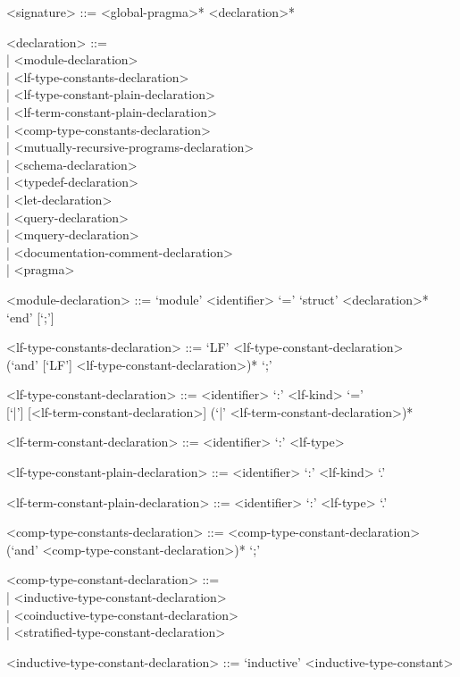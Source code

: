 \documentclass[11pt]{article}
\begin{document}
\begin{grammar}
<signature> ::= <global-pragma>* <declaration>*

<declaration> ::= \hfill\\
| <module-declaration>\\
| <lf-type-constants-declaration>\\
| <lf-type-constant-plain-declaration>\\
| <lf-term-constant-plain-declaration>\\
| <comp-type-constants-declaration>\\
| <mutually-recursive-programs-declaration>\\
| <schema-declaration>\\
| <typedef-declaration>\\
| <let-declaration>\\
| <query-declaration>\\
| <mquery-declaration>\\
| <documentation-comment-declaration>\\
| <pragma>

<module-declaration> ::= `module' <identifier> `=' `struct' <declaration>* `end' [`;']

<lf-type-constants-declaration> ::= `LF' <lf-type-constant-declaration>\\
(`and' [`LF'] <lf-type-constant-declaration>)* `;'

<lf-type-constant-declaration> ::= <identifier> `:' <lf-kind> `='\\{}
[`|'] [<lf-term-constant-declaration>] (`|' <lf-term-constant-declaration>)*

<lf-term-constant-declaration> ::= <identifier> `:' <lf-type>

<lf-type-constant-plain-declaration> ::= <identifier> `:' <lf-kind> `.'

<lf-term-constant-plain-declaration> ::= <identifier> `:' <lf-type> `.'

<comp-type-constants-declaration> ::= <comp-type-constant-declaration>\\
(`and' <comp-type-constant-declaration>)* `;'

<comp-type-constant-declaration> ::= \hfill\\
| <inductive-type-constant-declaration>\\
| <coinductive-type-constant-declaration>\\
| <stratified-type-constant-declaration>

<inductive-type-constant-declaration> ::= `inductive' <inductive-type-constant>


\end{grammar}
\end{document}

